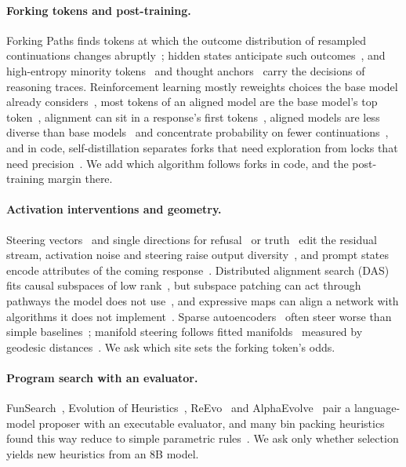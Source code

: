 \documentclass[11pt,letterpaper]{article}
\begin{document}
\paragraph{Forking tokens and post-training.} Forking Paths finds tokens at which the outcome distribution of resampled continuations changes abruptly~\citep{Bigelow2024}; hidden states anticipate such outcomes~\citep{Zur2025}, and high-entropy minority tokens~\citep{Wang2025} and thought anchors~\citep{Bogdan2025} carry the decisions of reasoning traces. Reinforcement learning mostly reweights choices the base model already considers~\citep{Meng2026}, most tokens of an aligned model are the base model's top token~\citep{Lin2023}, alignment can sit in a response's first tokens~\citep{Qi2024}, aligned models are less diverse than base models~\citep{Kirk2023,West2025} and concentrate probability on fewer continuations~\citep{Yang2025a}, and in code, self-distillation separates forks that need exploration from locks that need precision~\citep{Zhang2026}. We add which algorithm follows forks in code, and the post-training margin there.

\paragraph{Activation interventions and geometry.} Steering vectors~\citep{Rimsky2024} and single directions for refusal~\citep{Arditi2024} or truth~\citep{Marks2023} edit the residual stream, activation noise and steering raise output diversity~\citep{Khalid2026,Zhu2026}, and prompt states encode attributes of the coming response~\citep{Dong2025}. Distributed alignment search (DAS) fits causal subspaces of low rank~\citep{Geiger2023,Wu2023}, but subspace patching can act through pathways the model does not use~\citep{Makelov2023}, and expressive maps can align a network with algorithms it does not implement~\citep{Sutter2025}. Sparse autoencoders~\citep{Lieberum2024} often steer worse than simple baselines~\citep{Wu2025}; manifold steering follows fitted manifolds~\citep{Wurgaft2026} measured by geodesic distances~\citep{Tenenbaum2000}. We ask which site sets the forking token's odds.

\paragraph{Program search with an evaluator.} FunSearch~\citep{RomeraParedes2023}, Evolution of Heuristics~\citep{Liu2024}, ReEvo~\citep{Ye2024} and AlphaEvolve~\citep{Novikov2025} pair a language-model proposer with an executable evaluator, and many bin packing heuristics found this way reduce to simple parametric rules~\citep{Herrmann2026}. We ask only whether selection yields new heuristics from an 8B model.
\end{document}
